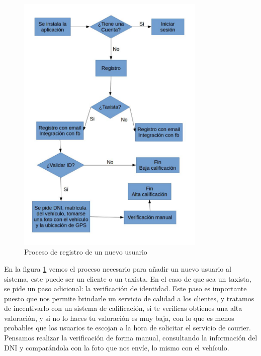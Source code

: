 \begin{figure}[htb]
\centering
\includegraphics[width=0.8\textwidth]{./img/proceso_registro_nuevo_usuario.jpg}
\caption{Proceso de registro de un nuevo usuario} \label{fig:proc_nuevo_usuario}
\end{figure}

En la figura \ref{fig:proc_nuevo_usuario} vemos el proceso necesario para añadir un nuevo usuario al sistema, este puede ser un cliente o un taxista. En el caso de que sea un taxista, se pide un paso adicional: la verificación de identidad. Este paso es importante puesto que nos permite brindarle un servicio de calidad a los clientes, y tratamos de incentivarlo con un sistema de calificación, si te verificas obtienes una alta valoración, y si no lo haces tu valoración es muy baja, con lo que es menos probables que los usuarios te escojan a la hora de solicitar el servicio de courier. Pensamos realizar la verificación de forma manual, consultando la información del DNI y comparándola con la foto que nos envíe, lo mismo con el vehículo.


